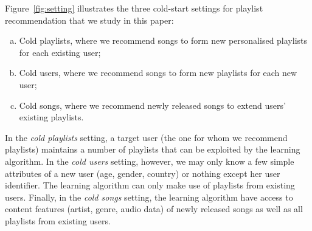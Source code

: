 Figure~\ref{fig:setting} illustrates the three cold-start settings for playlist recommendation 
that we study in this paper:
\begin{enumerate}[(a)]
\item Cold playlists, where we recommend songs to form new personalised playlists for each existing user;
%
\item Cold users, where we recommend songs to form new playlists for each new user;
%
\item Cold songs, where we recommend newly released songs to extend users' existing playlists.
\end{enumerate}

In the \emph{cold playlists} setting, a target user (\ie the one for whom we recommend playlists)
maintains a number of playlists that can be exploited by the learning algorithm.
In the \emph{cold users} setting, however, we may only know a few simple attributes of a new user
(\eg age, gender, country) or nothing except her user identifier. 
The learning algorithm can only make use of playlists from existing users.
Finally, in the \emph{cold songs} setting, the learning algorithm have access to 
content features (\eg artist, genre, audio data) 
of newly released songs as well as all playlists from existing users.

